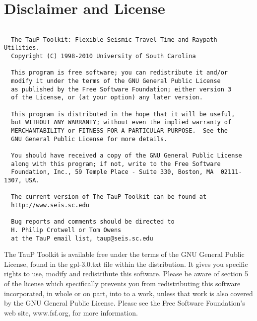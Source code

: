 
\section*{Disclaimer and License}
\begin{verbatim}

  The TauP Toolkit: Flexible Seismic Travel-Time and Raypath Utilities.
  Copyright (C) 1998-2010 University of South Carolina

  This program is free software; you can redistribute it and/or
  modify it under the terms of the GNU General Public License
  as published by the Free Software Foundation; either version 3
  of the License, or (at your option) any later version.

  This program is distributed in the hope that it will be useful,
  but WITHOUT ANY WARRANTY; without even the implied warranty of
  MERCHANTABILITY or FITNESS FOR A PARTICULAR PURPOSE.  See the
  GNU General Public License for more details.

  You should have received a copy of the GNU General Public License
  along with this program; if not, write to the Free Software
  Foundation, Inc., 59 Temple Place - Suite 330, Boston, MA  02111-1307, USA.

  The current version of The TauP Toolkit can be found at 
  http://www.seis.sc.edu

  Bug reports and comments should be directed to 
  H. Philip Crotwell or Tom Owens
  at the TauP email list, taup@seis.sc.edu

\end{verbatim}

The TauP Toolkit is available free under the terms of the GNU General Public 
License, found in the gpl-3.0.txt file within the distribution. It gives you 
specific rights to use, modify and redistribute this software. Please be
aware of section 5 of the license which specifically prevents you from 
redistributing this software incorporated, in whole
or on part, into to a work, unless that work is also covered by the 
GNU General Public License. Please see the Free Software Foundation's
web site, www.fsf.org, for more information.

